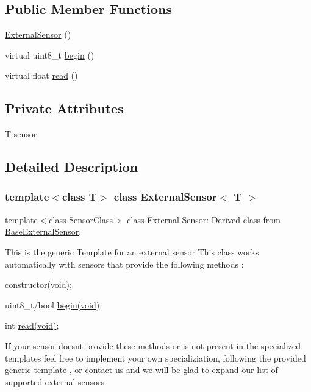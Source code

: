 \subsection*{Public Member Functions}
\begin{DoxyCompactItemize}
\item 
\hyperlink{classExternalSensor_a8b991447fba33253103d06198b838751}{External\+Sensor} ()
\item 
virtual uint8\+\_\+t \hyperlink{classExternalSensor_ab6fe1379d55b656a048e0fba1e0a32e6}{begin} ()
\item 
virtual float \hyperlink{classExternalSensor_a5fb3afc7d244fb86dac68ab5481bc407}{read} ()
\end{DoxyCompactItemize}
\subsection*{Private Attributes}
\begin{DoxyCompactItemize}
\item 
T \hyperlink{classExternalSensor_a6e1f518119abe08c14b498ce24a7e1b3}{sensor}
\end{DoxyCompactItemize}


\subsection{Detailed Description}
\subsubsection*{template$<$class T$>$\newline
class External\+Sensor$<$ T $>$}

template$<$class Sensor\+Class$>$ class External Sensor\+: Derived class from \hyperlink{classBaseExternalSensor}{Base\+External\+Sensor}. 

This is the generic Template for an external sensor This class works automatically with sensors that provide the following methods \+:
\begin{DoxyItemize}
\item constructor(void);
\item uint8\+\_\+t/bool \hyperlink{classExternalSensor_ab6fe1379d55b656a048e0fba1e0a32e6}{begin(void)};
\item int \hyperlink{classExternalSensor_a5fb3afc7d244fb86dac68ab5481bc407}{read(void)};
\end{DoxyItemize}

If your sensor doesn\textquotesingle{}t provide these methods or is not present in the specialized templates feel free to implement your own specializiation, following the provided generic template , or contact us and we will be glad to expand our list of supported external sensors 

